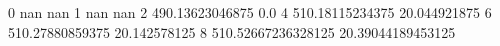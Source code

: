 0 nan nan
1 nan nan
2 490.13623046875 0.0
4 510.18115234375 20.044921875
6 510.27880859375 20.142578125
8 510.52667236328125 20.39044189453125
